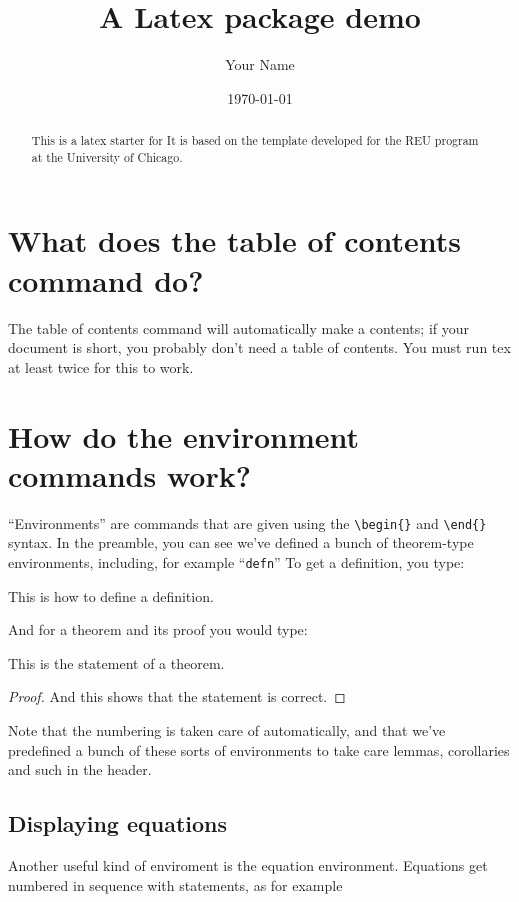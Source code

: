 \documentclass[11pt,oneside,draft]{amsart}
\title{A Latex package demo}
\author{Your Name}
\date{\today}
\begin{document}
\begin{abstract}
  This is a latex starter for It is based on the template developed for the REU
  program at the University of Chicago.
\end{abstract}

\maketitle

\tableofcontents

\section{What does the table of contents command do?}

The table of contents command will automatically make a contents; if
your document is short, you probably don't need a table of contents.
You must run tex at least twice for this to work.

\section{How do the environment commands work?}\label{env-commands}

``Environments'' are commands that are given using the \verb|\begin{}|
  and \verb|\end{}| syntax. In the preamble, you can see we've defined
  a bunch of theorem-type environments, including, for example ``\texttt{defn}'' To get a definition, 
you type:

\begin{defn}  This is how to define a definition.
\end{defn}

And for a theorem and its proof you would type:

\begin{thm}\label{atheorem}
This is the statement of a theorem.
\end{thm}
\begin{proof}
And this shows that the statement is correct.
\end{proof}

Note that the numbering is taken care of automatically, and that we've predefined a bunch of these sorts of environments to take care lemmas, corollaries and such in the header. 

\subsection{Displaying equations}
Another useful kind of enviroment is the equation environment.  Equations
get numbered in sequence with statements, as for example
\end{document}
